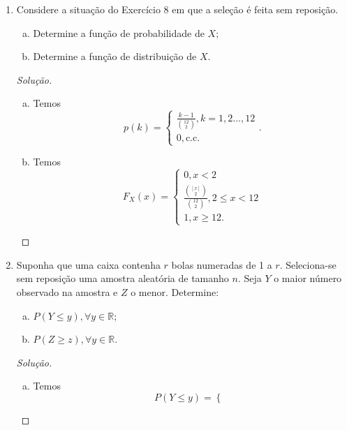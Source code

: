 \documentclass[../Notas.tex]{subfiles}
\begin{document}
\begin{enumerate}
\begin{proof}[Solução]
\[\begin{cases}
        \frac{2k-1}{144}, k = 1, 2, \dots, 12 \\
        0, \text{c.c.}
        \end{cases}.
        \]
    \end{proof}
    \item Considere a situação do Exercício 8 em que a seleção é feita sem reposição. 
    \begin{enumerate}[a)]
    \item Determine a função de probabilidade de $X$;
    \item Determine a função de distribuição de $X$.
    \end{enumerate}
    \begin{proof}[Solução]
        \begin{enumerate}[a)]
            \item Temos
            \[
            p(k) = \begin{cases}
            \frac{k-1}{\binom{12}{2}}, k=1,2\dots, 12 \\
            0, \text{c.c.}
            \end{cases}.
            \]
            \item Temos
            \[
            F_X(x) = \begin{cases}
            0, x < 2 \\
            \frac{\binom{[x]}{2}}{\binom{12}{2}}, 2\leq x < 12 \\
            1, x\geq 12.
            \end{cases}
            \]
        \end{enumerate}
    \end{proof}
    \item Suponha que uma caixa contenha $r$ bolas numeradas de 1 a $r$. Seleciona-se sem reposição uma amostra aleatória de tamanho $n$. Seja $Y$ o maior número observado na amostra e $Z$ o menor. Determine:
    \begin{enumerate}[a)]
    \item $P(Y \leq y), \forall y \in \mathbb{R}$;
    \item $P(Z \geq z), \forall y \in \mathbb{R}$.
    \end{enumerate}
    \begin{proof}[Solução]
        \begin{enumerate}[a)]
            \item Temos
            \[
            P(Y\leq y) = \begin{cases}

\end{cases}\]
\end{enumerate}
\end{proof}
\end{enumerate}
\end{document}

